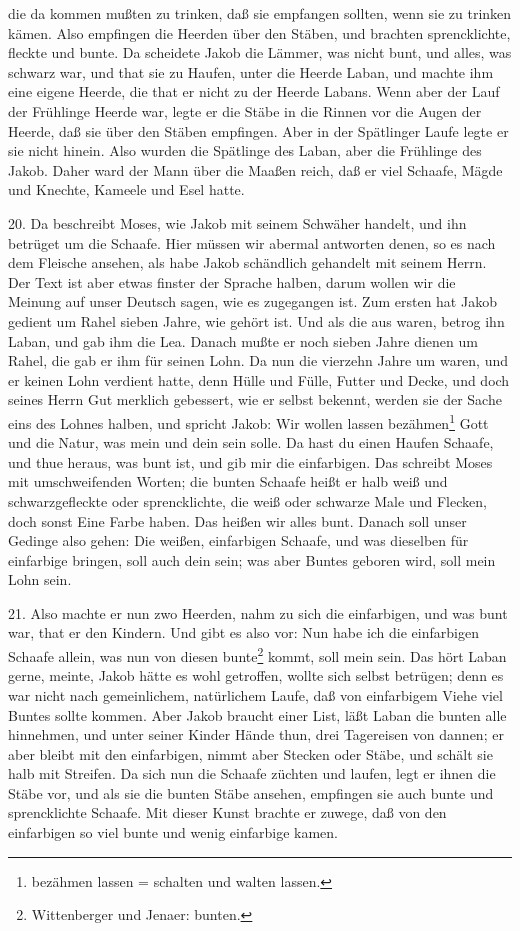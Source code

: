 die da kommen mußten zu trinken, daß sie empfangen sollten, wenn sie zu trinken kämen. Also empfingen die Heerden über den Stäben, und brachten sprencklichte, fleckte und bunte. Da scheidete Jakob die Lämmer, was nicht bunt, und alles, was schwarz war, und that sie zu Haufen, unter die Heerde Laban, und machte ihm eine eigene Heerde, die that er nicht zu der Heerde Labans. Wenn aber der Lauf der Frühlinge Heerde war, legte er die Stäbe in die Rinnen vor die Augen der Heerde, daß sie über den Stäben empfingen. Aber in der Spätlinger Laufe legte er sie nicht hinein. Also wurden die Spätlinge des Laban, aber die Frühlinge des Jakob. Daher ward der Mann über die Maaßen reich, daß er viel Schaafe, Mägde und Knechte, Kameele und Esel hatte.

20. Da beschreibt Moses, wie Jakob mit seinem Schwäher handelt, und ihn betrüget um die Schaafe. Hier müssen wir abermal antworten denen, so es nach dem Fleische ansehen, als habe Jakob schändlich gehandelt mit seinem Herrn. Der Text ist aber etwas finster der Sprache halben, darum wollen wir die Meinung auf unser Deutsch sagen, wie es zugegangen ist. Zum ersten hat Jakob gedient um Rahel sieben Jahre, wie gehört ist. Und als die aus waren, betrog ihn Laban, und gab ihm die Lea. Danach mußte er noch sieben Jahre dienen um Rahel, die gab er ihm für seinen Lohn. Da nun die vierzehn Jahre um waren, und er keinen Lohn verdient hatte, denn Hülle und Fülle, Futter und Decke, und doch seines Herrn Gut merklich gebessert, wie er selbst bekennt, werden sie der Sache eins des Lohnes halben, und spricht Jakob: Wir wollen lassen bezähmen\footnote{bezähmen lassen = schalten und walten lassen.} Gott und die Natur, was mein und dein sein solle. Da hast du einen Haufen Schaafe, und thue heraus, was bunt ist, und gib mir die einfarbigen. Das schreibt Moses mit umschweifenden Worten; die bunten Schaafe heißt er halb weiß und schwarzgefleckte oder sprencklichte, die weiß oder schwarze Male und Flecken, doch sonst Eine Farbe haben. Das heißen wir alles bunt. Danach soll unser Gedinge also gehen: Die weißen, einfarbigen Schaafe, und was dieselben für einfarbige bringen, soll auch dein sein; was aber Buntes geboren wird, soll mein Lohn sein.

21. Also machte er nun zwo Heerden, nahm zu sich die einfarbigen, und was bunt war, that er den Kindern. Und gibt es also vor: Nun habe ich die einfarbigen Schaafe allein, was nun von diesen bunte\footnote{Wittenberger und Jenaer: bunten.} kommt, soll mein sein. Das hört Laban gerne, meinte, Jakob hätte es wohl getroffen, wollte sich selbst betrügen; denn es war nicht nach gemeinlichem, natürlichem Laufe, daß von einfarbigem Viehe viel Buntes sollte kommen. Aber Jakob braucht einer List, läßt Laban die bunten alle hinnehmen, und unter seiner Kinder Hände thun, drei Tagereisen von dannen; er aber bleibt mit den einfarbigen, nimmt aber Stecken oder Stäbe, und schält sie halb mit Streifen. Da sich nun die Schaafe züchten und laufen, legt er ihnen die Stäbe vor, und als sie die bunten Stäbe ansehen, empfingen sie auch bunte und sprencklichte Schaafe. Mit dieser Kunst brachte er zuwege, daß von den einfarbigen so viel bunte und wenig einfarbige kamen.

